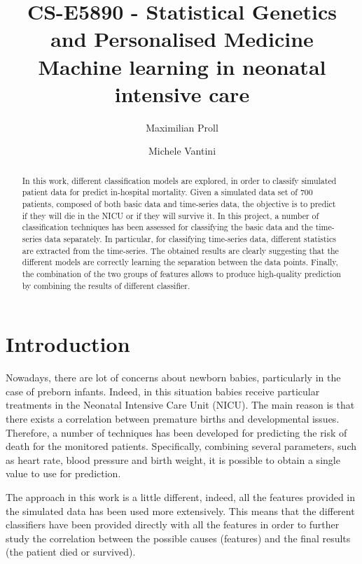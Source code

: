 \documentclass[a4paper,11pt]{article}
\begin{document}
\title{CS-E5890 - Statistical Genetics and Personalised Medicine \\ Machine learning in neonatal intensive care}

\author{Maximilian Proll \and Michele Vantini}

\maketitle


\begin{abstract}
In this work, different classification models are explored, in order to classify simulated patient data for predict in-hospital mortality. Given a simulated data set of 700 patients, composed of both basic data and time-series data, the objective is to predict if they will die in the NICU or if they will survive it.
In this project, a number of classification techniques has been assessed for classifying the basic data and the time-series data separately. In particular, for classifying time-series data, different statistics are extracted from the time-series. The obtained results are clearly suggesting that the different models are correctly learning the separation between the data points. Finally, the combination of the two groups of features allows to produce high-quality prediction by combining the results of different classifier.
\end{abstract}

\section{Introduction}
Nowadays, there are lot of concerns about newborn babies, particularly in the case of preborn infants. Indeed, in this situation babies receive particular treatments in the Neonatal Intensive Care Unit (NICU). The main reason is that there exists a correlation between premature births and developmental issues. Therefore, a number of techniques has been developed for predicting the risk of death for the monitored patients. Specifically, combining several parameters, such as heart rate, blood pressure and birth weight, it is possible to obtain a single value to use for prediction.

The approach in this work is a little different, indeed, all the features provided in the simulated data has been used more extensively. This means that the different classifiers have been provided directly with all the features in order to further study the correlation between the possible causes (features) and the final results (the patient died or survived).
\end{document}
